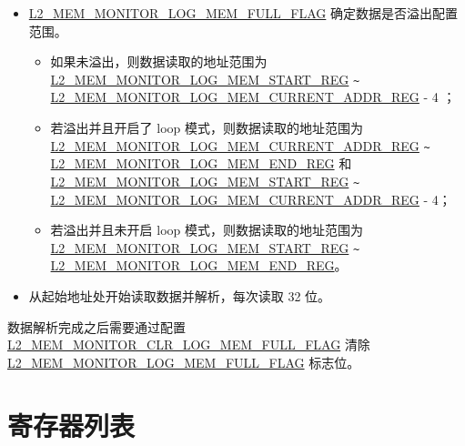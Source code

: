 \documentclass[main\_\_CN.tex]{subfiles}
\begin{document}
\begin{itemize}
    \item \hyperref[fielddesc:L2MEMMONITORLOGMEMFULLFLAG]{L2\_MEM\_MONITOR\_LOG\_MEM\_FULL\_FLAG} 确定数据是否溢出配置范围。
    \begin{itemize}
        \item 如果未溢出，则数据读取的地址范围为 \hyperref[regdesc:L2MEMMONITORLOGMEMSTARTREG]{L2\_MEM\_MONITOR\_LOG\_MEM\_START\_REG}  \verb+~+ \hyperref[regdesc:L2MEMMONITORLOGMEMCURRENTADDRREG]{L2\_MEM\_MONITOR\_LOG\_MEM\_CURRENT\_ADDR\_REG} - 4 ；
        \item 若溢出并且开启了 loop 模式，则数据读取的地址范围为 \hyperref[regdesc:L2MEMMONITORLOGMEMCURRENTADDRREG]{L2\_MEM\_MONITOR\_LOG\_MEM\_CURRENT\_ADDR\_REG} \verb+~+ \hyperref[regdesc:L2MEMMONITORLOGMEMENDREG]{L2\_MEM\_MONITOR\_LOG\_MEM\_END\_REG} 和 \hyperref[regdesc:L2MEMMONITORLOGMEMSTARTREG]{L2\_MEM\_MONITOR\_LOG\_MEM\_START\_REG} \verb+~+ \hyperref[regdesc:L2MEMMONITORLOGMEMCURRENTADDRREG]{L2\_MEM\_MONITOR\_LOG\_MEM\_CURRENT\_ADDR\_REG} - 4；
        \item 若溢出并且未开启 loop 模式，则数据读取的地址范围为 \hyperref[regdesc:L2MEMMONITORLOGMEMSTARTREG]{L2\_MEM\_MONITOR\_LOG\_MEM\_START\_REG} \verb+~+ \hyperref[regdesc:L2MEMMONITORLOGMEMENDREG]{L2\_MEM\_MONITOR\_LOG\_MEM\_END\_REG}。
    \end{itemize}
    \item 从起始地址处开始读取数据并解析，每次读取 32 位。

\end{itemize}

数据解析完成之后需要通过配置 \hyperref[fielddesc:L2MEMMONITORCLRLOGMEMFULLFLAG]{L2\_MEM\_MONITOR\_CLR\_LOG\_MEM\_FULL\_FLAG} 清除  \hyperref[fielddesc:L2MEMMONITORLOGMEMFULLFLAG]{L2\_MEM\_MONITOR\_LOG\_MEM\_FULL\_FLAG} 标志位。





\newpage
\hypertarget{dbgassist-reg-summ}{}
\section{寄存器列表}
\label{sec:dbgassist-reg-summ}
\end{document}
